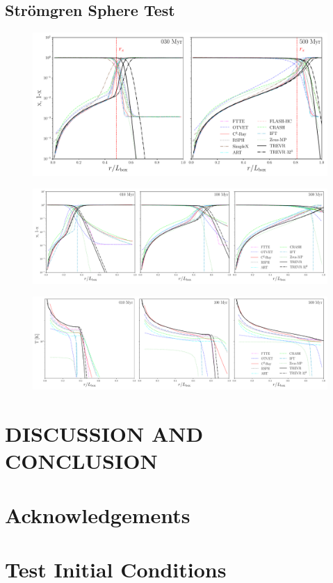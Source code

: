 \documentclass[fleq,usenatbib]{mnras}
\begin{document}
\subsection{Str\"{o}mgren Sphere Test}
\begin{figure}
\includegraphics[width=1\linewidth]{Figures/strom_iso_fraction.pdf}
\caption{}
\label{fig:stromiso}
\end{figure}
\begin{figure}
\includegraphics[width=1\linewidth]{Figures/strom_fraction.pdf}
\caption{}
\label{fig:stromtherm}
\end{figure}
\begin{figure}
\includegraphics[width=1\linewidth]{Figures/strom_temp.pdf}
\caption{}
\label{fig:stromtemp}
\end{figure}
\section{DISCUSSION AND CONCLUSION}\label{sec:disc}

\section*{Acknowledgements}\label{sec:ackn}








\appendix
\section{Test Initial Conditions}\label{sec:icnd}

\bsp
\label{lastpage}
\end{document}
